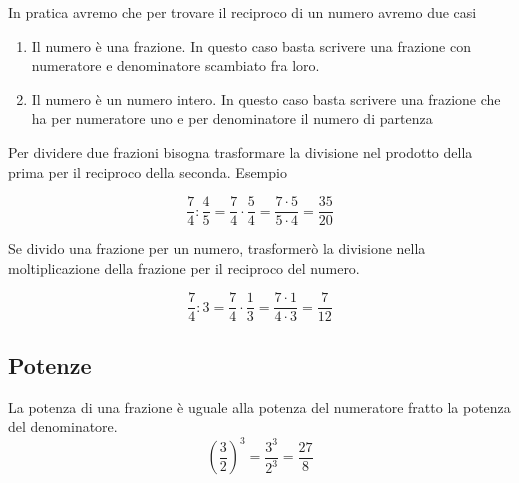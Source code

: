 In pratica  avremo che per trovare il reciproco di un numero avremo due casi
\begin{enumerate}
	\item Il numero è una frazione. In questo caso basta scrivere una frazione con numeratore e denominatore scambiato fra loro.
	\item Il numero è un numero intero. In questo caso basta scrivere una frazione che ha per numeratore uno e per denominatore il numero di partenza 
\end{enumerate}

Per dividere due frazioni bisogna trasformare la divisione nel prodotto della prima per il reciproco della seconda. Esempio

\[\dfrac{7}{4}:\dfrac{4}{5}=\dfrac{7}{4}\cdot\dfrac{5}{4}=\dfrac{7\cdot 5}{5\cdot 4}=\dfrac{35}{20}\]

Se divido una frazione per un numero, trasformerò la divisione nella moltiplicazione della frazione per il reciproco del numero.

\[\dfrac{7}{4}:3=\dfrac{7}{4}\cdot\dfrac{1}{3}=\dfrac{7\cdot 1}{4\cdot 3}=\dfrac{7}{12}\]
\subsection{Potenze}

La potenza di una frazione è uguale alla potenza del numeratore fratto la potenza del denominatore.
\[\left( \dfrac{3}{2}\right)^3=\dfrac{3^3}{2^3}=\dfrac{27}{8} \]


